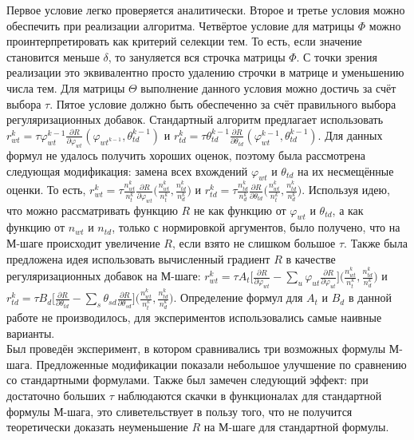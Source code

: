 \documentclass[12pt]{article}
\renewcommand{\phi}{\varphi}
\begin{document}
Первое условие легко проверяется аналитически. Второе и третье условия можно обеспечить при реализации алгоритма. Четвёртое условие для матрицы $\Phi$ можно проинтерпретировать как критерий селекции тем. То есть, если значение становится меньше $\delta$, то зануляется вся строчка матрицы $\Phi$. С точки зрения реализации это эквивалентно просто удалению строчки в матрице и уменьшению числа тем. Для матрицы $\Theta$ выполнение данного условия можно достичь за счёт выбора $\tau$. Пятое условие должно быть обеспеченно за счёт правильного выбора регуляризационных добавок. Стандартный алгоритм предлагает использовать $r_{wt}^{k} = \tau \phi_{wt}^{k-1} \frac{\partial{R}}{\partial{\phi_{wt}}}(\phi_{wt^{k-1}}, \theta_{td}^{k-1})$ и $r_{td}^{k}=\tau  \theta_{td}^{k-1} \frac{\partial{R}}{\partial{\theta_{td}}}(\phi_{wt}^{k-1}, \theta_{td}^{k-1})$. Для данных формул не удалось получить хороших оценок, поэтому была рассмотрена следующая модификация: замена всех вхождений $\phi_{wt}$ и $\theta_{td}$ на их несмещённые оценки. То есть,  $r_{wt}^k= \tau \frac{n^k_{wt}}{n^k_t}\frac{\partial{R}}{\partial{\phi_{wt}}}\bigl(\frac{n^k_{wt}}{n^k_t}, \frac{n^k_{td}}{n^k_d}\bigr)$ и $r_{td}^k= \tau \frac{n^k_{td}}{n^k_d}\frac{\partial{R}}{\partial{\theta_{td}}}\bigl(\frac{n^k_{wt}}{n^k_t}, \frac{n^k_{td}}{n^k_d}\bigr)$. Используя идею, что можно рассматривать функцию $R$ не как функцию от $\phi_{wt}$ и $\theta_{td}$, а как функцию от $n_{wt}$ и $n_{td}$, только с нормировкой аргументов, было получено, что на М-шаге происходит увеличение $R$, если взято не слишком большое $\tau$. Также была предложена идея использовать вычисленный градиент $R$ в качестве регуляризационных добавок на М-шаге: $r^k_{wt} = \tau A_t \bigl[{\frac{\partial{R}}{\partial{\phi_{wt}}} - \sum\limits_u \phi_{ut} \frac{\partial{R}}{\partial{\phi_{ut}}} }\bigr] \bigl(\frac{n^k_{wt}}{n^k_t}, \frac{n^k_{td}}{n^k_d}\bigr)$ и $r^k_{td} = \tau B_d \bigl[ {\frac{\partial{R}}{\partial{\theta_{td}}} - \sum\limits_s \theta_{sd} \frac{\partial{R}}{\partial{\theta_{sd}}} }\bigr] \bigl(\frac{n^k_{wt}}{n^k_t}, \frac{n^k_{td}}{n^k_d}\bigr)$. Определение формул для $A_t$ и $B_d$ в данной работе не производилось, для экспериментов использовались самые наивные варианты.\\
Был проведён эксперимент, в котором сравнивались три возможных формулы М-шага. Предложенные модификации показали небольшое улучшение по сравнению со стандартными формулами. Также был замечен следующий эффект: при достаточно больших $\tau$ наблюдаются скачки в функционалах для стандартной формулы М-шага, это сливетельствует в пользу того, что не получится теоретически доказать неуменьшение $R$ на М-шаге для стандартной формулы.\\
\end{document}
